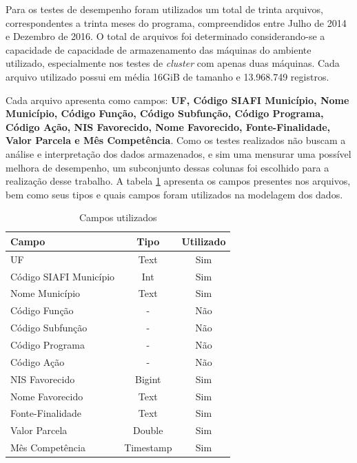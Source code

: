 Para os testes de desempenho foram utilizados um total de trinta arquivos, correspondentes a trinta meses do programa, compreendidos entre Julho de 2014 e Dezembro de 2016. O total de arquivos foi determinado considerando-se a capacidade de capacidade de armazenamento das máquinas do ambiente utilizado, especialmente nos testes de \emph{cluster} com apenas duas máquinas. Cada arquivo utilizado possui em média 16GiB de tamanho e 13.968.749 registros.

Cada arquivo apresenta como campos: \textbf{UF, Código SIAFI Município, Nome Município, Código Função, Código Subfunção, Código Programa, Código Ação, NIS Favorecido, Nome Favorecido, Fonte-Finalidade, Valor Parcela e Mês Competência}. Como os testes realizados não buscam a análise e interpretação dos dados armazenados, e sim uma mensurar uma possível melhora de desempenho, um subconjunto dessas colunas foi escolhido para a realização desse trabalho. A tabela \ref{tab:colunas} apresenta os campos presentes nos arquivos, bem como seus tipos e quais campos foram utilizados na modelagem dos dados.

\begin{table}[]
	\centering
	\caption{Campos utilizados}
	\label{tab:colunas}
	\begin{tabular}{|l|c|c|}
		\hline
		\textbf{Campo}         & \textbf{Tipo} & \textbf{Utilizado} \\ \hline
		UF                     & Text          & Sim                \\ \hline
		Código SIAFI Município & Int           & Sim                \\ \hline
		Nome Município         & Text          & Sim                \\ \hline
		Código Função          & -             & Não                \\ \hline
		Código Subfunção       & -             & Não                \\ \hline
		Código Programa        & -             & Não                \\ \hline
		Código Ação            & -             & Não                \\ \hline
		NIS Favorecido         & Bigint        & Sim                \\ \hline
		Nome Favorecido        & Text          & Sim                \\ \hline
		Fonte-Finalidade       & Text          & Sim                \\ \hline
		Valor Parcela          & Double        & Sim                \\ \hline
		Mês Competência        & Timestamp     & Sim                \\ \hline
	\end{tabular}
\end{table}

